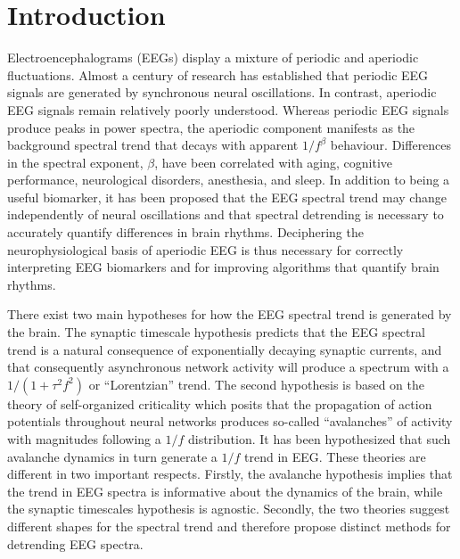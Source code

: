 \section{Introduction}
Electroencephalograms (EEGs) display a mixture of periodic and aperiodic fluctuations. Almost a century of research has established that periodic EEG signals are generated by synchronous neural oscillations\cite{Berger1929,Buzsaki2012,Nunez2006,steriade2005cellular}. In contrast, aperiodic EEG signals remain relatively poorly understood. Whereas periodic EEG signals produce peaks in power spectra, the aperiodic component manifests as the background spectral trend that decays with apparent $1/f^\beta$ behaviour\cite{He2014,Manning2009,Miller2009,Pritchard1992}. Differences in the spectral exponent, $\beta$, have been correlated with aging, cognitive performance, neurological disorders, anesthesia, and sleep\cite{Colombo2019,Lendner2020,Ouyang2020,Roche2019,Voytek2015,Donoghue2020}. In addition to being a useful biomarker, it has been proposed that the EEG spectral trend may change independently of neural oscillations and that spectral detrending is necessary to accurately quantify differences in brain rhythms\cite{Donoghue2020}. Deciphering the neurophysiological basis of aperiodic EEG is thus necessary for correctly interpreting EEG biomarkers and for improving algorithms that quantify brain rhythms.

There exist two main hypotheses for how the EEG spectral trend is generated by the brain. The synaptic timescale hypothesis predicts that the EEG spectral trend is a natural consequence of exponentially decaying synaptic currents, and that consequently asynchronous network activity will produce a spectrum with a $1/(1+\tau^2f^2)$ or “Lorentzian” trend\cite{Bedard2006,Gao2017,Miller2009}. The second hypothesis is based on the theory of self-organized criticality which posits that the propagation of action potentials throughout neural networks produces so-called “avalanches” of activity with magnitudes following a $1/f$ distribution\cite{Bak1987,Beggs2003,Priesemann2014}. It has been hypothesized that such avalanche dynamics in turn generate a $1/f$ trend in EEG\cite{Chaudhuri2018,He2014,Lombardi2017}. These theories are different in two important respects. Firstly, the avalanche hypothesis implies that the trend in EEG spectra is informative about the dynamics of the brain, while the synaptic timescales hypothesis is agnostic. Secondly, the two theories suggest different shapes for the spectral trend and therefore propose distinct methods for detrending EEG spectra\cite{Donoghue2020}.  

